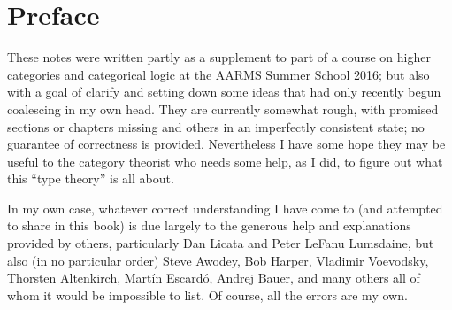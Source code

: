 \chapter{Preface}

These notes were written partly as a supplement to part of a course on higher categories and categorical logic at the AARMS Summer School 2016; but also with a goal of clarify and setting down some ideas that had only recently begun coalescing in my own head.
They are currently somewhat rough, with promised sections or chapters missing and others in an imperfectly consistent state; no guarantee of correctness is provided.
Nevertheless I have some hope they may be useful to the category theorist who needs some help, as I did, to figure out what this ``type theory'' is all about.

In my own case, whatever correct understanding I have come to (and attempted to share in this book) is due largely to the generous help and explanations provided by others, particularly Dan Licata and Peter LeFanu Lumsdaine, but also (in no particular order) Steve Awodey, Bob Harper, Vladimir Voevodsky, Thorsten Altenkirch, Mart\'in Escard\'o, Andrej Bauer, and many others all of whom it would be impossible to list.
Of course, all the errors are my own.


